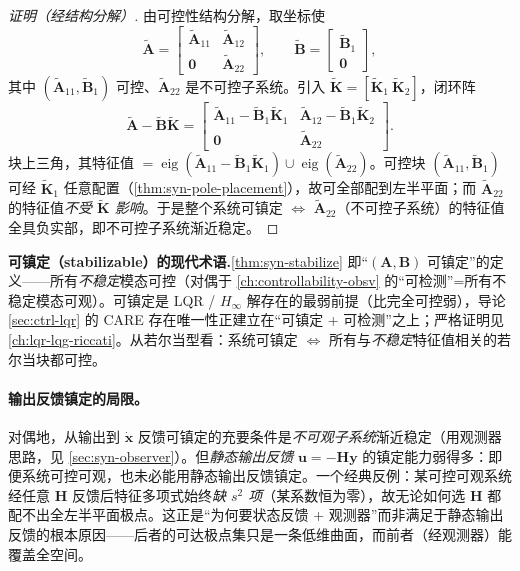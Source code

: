 \begin{proof}[证明（经结构分解）]
由可控性结构分解，取坐标使
\begin{equation}
  \tilde{\mathbf A}=\begin{bmatrix}\tilde{\mathbf A}_{11}&\tilde{\mathbf A}_{12}\\\mathbf 0&\tilde{\mathbf A}_{22}\end{bmatrix},\qquad \tilde{\mathbf B}=\begin{bmatrix}\tilde{\mathbf B}_1\\\mathbf 0\end{bmatrix},
  \label{eq:syn-stab-decomp}
\end{equation}
其中 $(\tilde{\mathbf A}_{11},\tilde{\mathbf B}_1)$ 可控、$\tilde{\mathbf A}_{22}$ 是不可控子系统。引入 $\tilde{\mathbf K}=[\tilde{\mathbf K}_1\ \tilde{\mathbf K}_2]$，闭环阵
\begin{equation}
  \tilde{\mathbf A}-\tilde{\mathbf B}\tilde{\mathbf K}=\begin{bmatrix}\tilde{\mathbf A}_{11}-\tilde{\mathbf B}_1\tilde{\mathbf K}_1&\tilde{\mathbf A}_{12}-\tilde{\mathbf B}_1\tilde{\mathbf K}_2\\\mathbf 0&\tilde{\mathbf A}_{22}\end{bmatrix}.
  \label{eq:syn-stab-closed}
\end{equation}
块上三角，其特征值 $=\operatorname{eig}(\tilde{\mathbf A}_{11}-\tilde{\mathbf B}_1\tilde{\mathbf K}_1)\cup\operatorname{eig}(\tilde{\mathbf A}_{22})$。可控块 $(\tilde{\mathbf A}_{11},\tilde{\mathbf B}_1)$ 可经 $\tilde{\mathbf K}_1$ 任意配置（\cref{thm:syn-pole-placement}），故可全部配到左半平面；而 $\tilde{\mathbf A}_{22}$ 的特征值\emph{不受 $\tilde{\mathbf K}$ 影响}。于是整个系统可镇定 $\iff$ $\tilde{\mathbf A}_{22}$（不可控子系统）的特征值全具负实部，即不可控子系统渐近稳定。
\end{proof}

\begin{note}
\textbf{可镇定（stabilizable）的现代术语.}\;\cref{thm:syn-stabilize} 即“$(\mathbf A,\mathbf B)$ 可镇定”的定义——所有\emph{不稳定}模态可控（对偶于 \cref{ch:controllability-obsv} 的“可检测”=所有不稳定模态可观）。可镇定是 LQR / $H_\infty$ 解存在的最弱前提（比完全可控弱），导论 \cref{sec:ctrl-lqr} 的 CARE 存在唯一性正建立在“可镇定 + 可检测”之上；严格证明见 \cref{ch:lqr-lqg-riccati}。从若尔当型看：系统可镇定 $\iff$ 所有与\emph{不稳定}特征值相关的若尔当块都可控\cite{zhang2017modern}。
\end{note}

\paragraph{输出反馈镇定的局限。}
对偶地，从输出到 $\dot{\mathbf x}$ 反馈可镇定的充要条件是\emph{不可观子系统}渐近稳定（用观测器思路，见 \cref{sec:syn-observer}）。但\emph{静态输出反馈} $\mathbf u=-\mathbf H\mathbf y$ 的镇定能力弱得多：即便系统可控可观，也未必能用静态输出反馈镇定。一个经典反例\cite{liubao2006modern}：某可控可观系统经任意 $\mathbf H$ 反馈后特征多项式始终\emph{缺 $s^2$ 项}（某系数恒为零），故无论如何选 $\mathbf H$ 都配不出全左半平面极点。这正是“为何要状态反馈 + 观测器”而非满足于静态输出反馈的根本原因——后者的可达极点集只是一条低维曲面，而前者（经观测器）能覆盖全空间。

